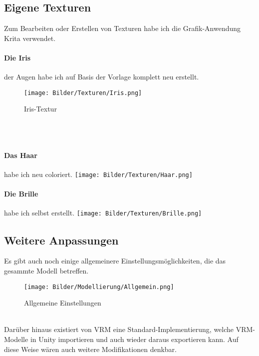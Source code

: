 \documentclass[a4paper, 12pt]{article}
\begin{document}
\subsection{Eigene Texturen}
\label{subsec:textures}
Zum Bearbeiten oder Erstellen von Texturen habe ich
die Grafik-Anwendung Krita\cite{krita} verwendet.
\paragraph{Die Iris} der Augen habe ich auf Basis der Vorlage komplett neu erstellt.
\begin{figure}[htbp]
    \centering
    \texttt{[image: Bilder/Texturen/Iris.png]}
    \caption{Iris-Textur}
\end{figure}
\\\\
\begin{minipage}[c]{0.5\textwidth}
    \paragraph{Das Haar} habe ich neu coloriert.
    \centering
    \texttt{[image: Bilder/Texturen/Haar.png]}
\end{minipage}
\begin{minipage}[c]{0.5\textwidth}
    \paragraph{Die Brille} habe ich selbst erstellt.
    \centering
    \texttt{[image: Bilder/Texturen/Brille.png]}
\end{minipage}
\newpage

\subsection{Weitere Anpassungen}
\label{subsec:misc}
Es gibt auch noch einige allgemeinere Einstellungsmöglichkeiten,
die das gesammte Modell betreffen.
\begin{figure}[htbp]
    \centering
    \texttt{[image: Bilder/Modellierung/Allgemein.png]}
    \caption{Allgemeine Einstellungen}
\end{figure}
\\Darüber hinaus existiert von VRM eine Standard-Implementierung,
welche VRM-Modelle in Unity importieren und auch wieder daraus exportieren kann\cite{univrm}.
Auf diese Weise wären auch weitere Modifikationen denkbar.
\end{document}
